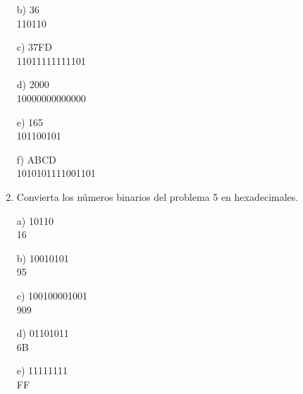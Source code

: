 \documentclass[a4paper, 12pt]{article}
\newcommand{\Aspace}{0.2cm}
\begin{document}
\begin{enumerate}
            \vspace{\Aspace} \par
            b) 36
            \\ { \color{azul} 110110 }

            \vspace{\Aspace} \par
            c) 37FD
            \\ { \color{azul} 11011111111101 }

            \vspace{\Aspace} \par
            d) 2000
            \\ { \color{azul} 10000000000000 }

            \vspace{\Aspace} \par
            e) 165
            \\ { \color{azul} 101100101 }

            \vspace{\Aspace} \par
            f) ABCD
            \\ { \color{azul} 1010101111001101 }


        \item Convierta los números binarios del problema 5 en hexadecimales.
            \vspace{\Aspace} \par
            a) 10110
            \\ { \color{azul} 16 }

            \vspace{\Aspace} \par
            b) 10010101
            \\ { \color{azul} 95 }

            \vspace{\Aspace} \par
            c) 100100001001
            \\ { \color{azul} 909 }

            \vspace{\Aspace} \par
            d) 01101011
            \\ { \color{azul} 6B }

            \vspace{\Aspace} \par
            e) 11111111
            \\ { \color{azul} FF }


\end{enumerate}
\end{document}
